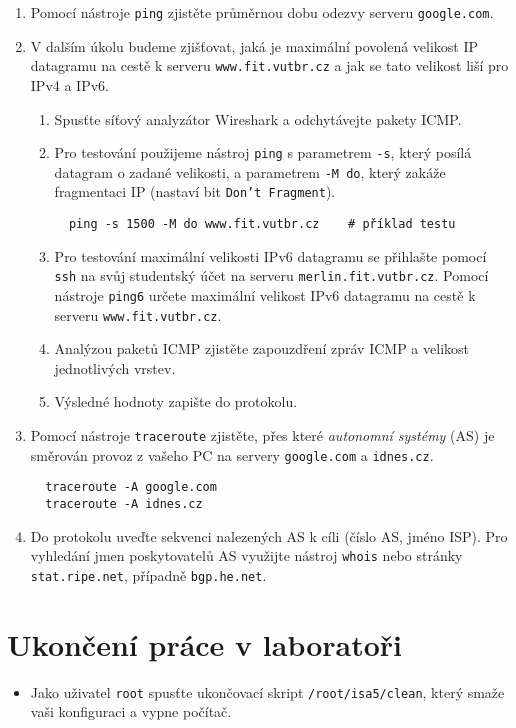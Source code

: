 \documentclass[a4paper,11pt]{article}
\begin{document}
\begin{enumerate}
  \item Pomocí nástroje \texttt{ping} zjistěte průměrnou dobu odezvy serveru \texttt{google.com}.
  \item V dalším úkolu budeme zjišťovat, jaká je maximální povolená velikost IP datagramu na cestě k serveru \texttt{www.fit.vutbr.cz} a jak se tato velikost liší pro IPv4 a IPv6.
  \begin{enumerate}
    \item Spusťte síťový analyzátor Wireshark a odchytávejte pakety ICMP.
    \item Pro testování použijeme nástroj {\tt ping} s parametrem \texttt{-s}, který posílá datagram o zadané velikosti, a parametrem \texttt{-M do}, který zakáže fragmentaci IP (nastaví bit \texttt{Don't Fragment}).
\begin{verbatim}
  ping -s 1500 -M do www.fit.vutbr.cz    # příklad testu        
\end{verbatim}
    \item Pro testování maximální velikosti IPv6 datagramu se přihlašte pomocí {\tt ssh} na svůj studentský účet na serveru {\tt merlin.fit.vutbr.cz}. Pomocí nástroje {\tt ping6} určete maximální velikost IPv6 datagramu na cestě k serveru \texttt{www.fit.vutbr.cz}.
    \item Analýzou paketů ICMP  zjistěte zapouzdření zpráv ICMP a velikost jednotlivých vrstev.
    \item Výsledné hodnoty zapište do protokolu. 
  \end{enumerate}
  \item Pomocí nástroje \texttt{traceroute} zjistěte, přes které {\em autonomní systémy} (AS) je směrován provoz z vašeho PC na servery \texttt{google.com} a \texttt{idnes.cz}.
\begin{verbatim}
  traceroute -A google.com
  traceroute -A idnes.cz
\end{verbatim}
  \item Do protokolu uveďte sekvenci nalezených AS k cíli (číslo AS, jméno ISP). Pro vyhledání jmen poskytovatelů AS využijte nástroj {\tt whois} nebo stránky \texttt{stat.ripe.net}, případně \texttt{bgp.he.net}.
\end{enumerate}

\section*{Ukončení práce v laboratoři}
\begin{itemize}
  \item Jako uživatel {\tt root} spusťte ukončovací skript {\tt /root/isa5/clean}, který smaže vaši konfiguraci a vypne počítač. 
\end{itemize}
\end{document}
